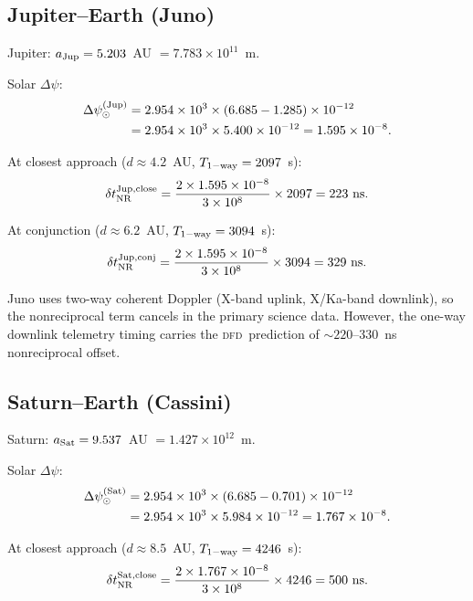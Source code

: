 \documentclass[aps,prl,twocolumn,superscriptaddress,showpacs]{revtex4-2}
\newcommand{\DFD}{\textsc{dfd}}
\begin{document}
\subsection{Jupiter--Earth (Juno)}

Jupiter: $a_{\rm Jup} = 5.203$~AU $= 7.783\times 10^{11}$~m.

Solar $\Delta\psi$:
\begin{align}
\Delta\psi_\odot^{(\rm Jup)} &= 2.954\times 10^3
\times(6.685 - 1.285)\times 10^{-12} \nonumber\\
&= 2.954\times 10^3\times 5.400\times 10^{-12}
= 1.595\times 10^{-8}.
\end{align}

At closest approach ($d \approx 4.2$~AU, $T_{\rm 1-way} = 2097$~s):
\begin{equation}
\delta t_{\rm NR}^{\rm Jup,close} = \frac{2\times 1.595\times 10^{-8}}{3\times 10^8}
\times 2097 = 223~\text{ns}.
\end{equation}

At conjunction ($d \approx 6.2$~AU, $T_{\rm 1-way} = 3094$~s):
\begin{equation}
\delta t_{\rm NR}^{\rm Jup,conj} = \frac{2\times 1.595\times 10^{-8}}{3\times 10^8}
\times 3094 = 329~\text{ns}.
\end{equation}

Juno uses two-way coherent Doppler (X-band uplink, X/Ka-band
downlink), so the nonreciprocal term cancels in the primary
science data.  However, the one-way downlink telemetry timing
carries the \DFD\ prediction of $\sim 220$--$330$~ns nonreciprocal
offset.

\subsection{Saturn--Earth (Cassini)}

Saturn: $a_{\rm Sat} = 9.537$~AU $= 1.427\times 10^{12}$~m.

Solar $\Delta\psi$:
\begin{align}
\Delta\psi_\odot^{(\rm Sat)} &= 2.954\times 10^3
\times(6.685 - 0.701)\times 10^{-12} \nonumber\\
&= 2.954\times 10^3\times 5.984\times 10^{-12}
= 1.767\times 10^{-8}.
\end{align}

At closest approach ($d \approx 8.5$~AU, $T_{\rm 1-way} = 4246$~s):
\begin{equation}
\delta t_{\rm NR}^{\rm Sat,close} = \frac{2\times 1.767\times 10^{-8}}{3\times 10^8}
\times 4246 = 500~\text{ns}.
\end{equation}
\end{document}
